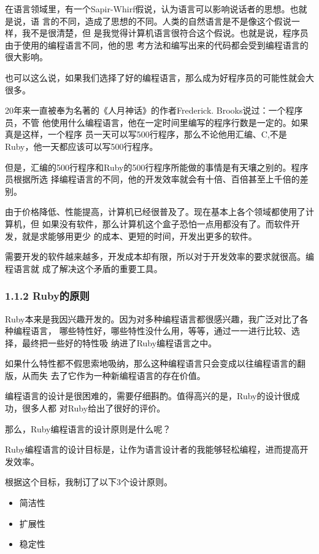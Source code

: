\documentclass[11pt]{ctexart}
\begin{document}
在语言领域里，有一个Sapir-Whirf假说，认为语言可以影响说话者的思想。也就是说，语
言的不同，造成了思想的不同。人类的自然语言是不是像这个假说一样，我不是很清楚，但
是我觉得计算机语言很符合这个假说。也就是说，程序员由于使用的编程语言不同，他的思
考方法和编写出来的代码都会受到编程语言的很大影响。

也可以这么说，如果我们选择了好的编程语言，那么成为好程序员的可能性就会大很多。

20年来一直被奉为名著的《人月神话》的作者Frederick. Brooks说过：一个程序员，不管
他使用什么编程语言，他在一定时间里编写的程序行数是一定的。如果真是这样，一个程序
员一天可以写500行程序，那么不论他用汇编、C,不是Ruby，他一天都应该可以写500行程序。

但是，汇编的500行程序和Ruby的500行程序所能做的事情是有天壤之别的。程序员根据所选
择编程语言的不同，他的开发效率就会有十倍、百倍甚至上千倍的差别。

由于价格降低、性能提高，计算机已经很普及了。现在基本上各个领域都使用了计算机，但
如果没有软件，那么计算机这个盒子恐怕一点用都没有了。而软件开发，就是求能够用更少
的成本、更短的时间，开发出更多的软件。

需要开发的软件越来越多，开发成本却有限，所以对于开发效率的要求就很高。编程语言就
成了解决这个矛盾的重要工具。

\subsubsection{1.1.2 Ruby的原则}
\label{sec:orgd30c6c0}

Ruby本来是我因兴趣开发的。因为对多种编程语言都很感兴趣，我广泛对比了各种编程语言，
哪些特性好，哪些特性没什么用，等等，通过一一进行比较、选择，最终把一些好的特性吸
纳进了Ruby编程语言之中。

如果什么特性都不假思索地吸纳，那么这种编程语言只会变成以往编程语言的翻版，从而失
去了它作为一种新编程语言的存在价值。

编程语言的设计是很困难的，需要仔细斟酌。值得高兴的是，Ruby的设计很成功，很多人都
对Ruby给出了很好的评价。

那么，Ruby编程语言的设计原则是什么呢？

Ruby编程语言的设计目标是，让作为语言设计者的我能够轻松编程，进而提高开发效率。

根据这个目标，我制订了以下3个设计原则。

\begin{itemize}
\item 简洁性
\item 扩展性
\item 稳定性
\end{itemize}
\end{document}
